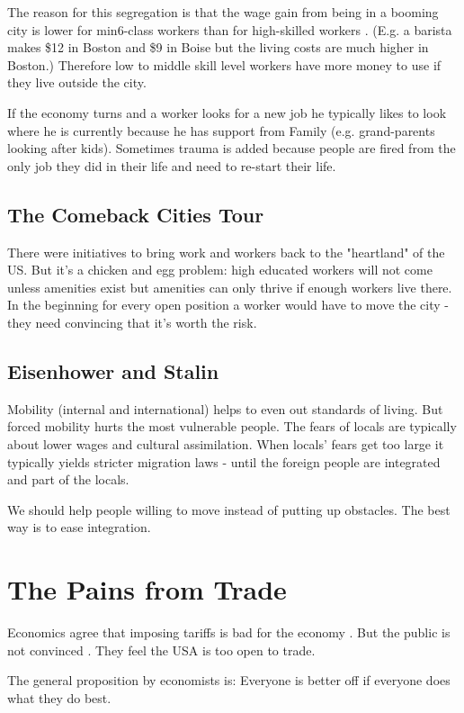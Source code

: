 \documentclass[a4paper, twocolumn]{article}
\begin{document}
The reason for this segregation is that the wage gain from being in a booming city is lower for min6-class workers than for high-skilled workers \cite{wage-gap}. (E.g. a barista makes \$12 in Boston and \$9 in Boise but the living costs are much higher in Boston.) Therefore low to middle skill level workers have more money to use if they live outside the city.

If the economy turns and a worker looks for a new job he typically likes to look where he is currently because he has support from Family (e.g. grand-parents looking after kids). Sometimes trauma is added because people are fired from the only job they did in their life and need to re-start their life.

\subsection{The Comeback Cities Tour}
There were initiatives to bring work and workers back to the "heartland" of the US. But it's a chicken and egg problem: high educated workers will not come unless amenities exist but amenities can only thrive if enough workers live there. In the beginning for every open position a worker would have to move the city - they need convincing that it's worth the risk.

\subsection{Eisenhower and Stalin}
Mobility (internal and international) helps to even out standards of living. But forced mobility hurts the most vulnerable people. The fears of locals are typically about lower wages and cultural assimilation. When locals' fears get too large it typically yields stricter migration laws - until the foreign people are integrated and part of the locals.

We should help people willing to move instead of putting up obstacles. The best way is to ease integration.

\section{The Pains from Trade}

Economics agree that imposing tariffs is bad for the economy \cite{steel-tariffs}. But the public is not convinced \cite{people-like-economics}. They feel the USA is too open to trade.

The general proposition by economists is: Everyone is better off if everyone does what they do best.
\end{document}
